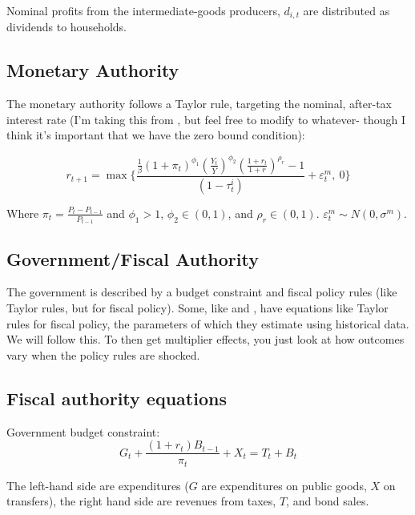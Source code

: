\documentclass[article,11pt,letterpaper,fleqn]{article}
\theoremstyle{definition}
\numberwithin{equation}{section}
\newcommand{\cn}{\citeasnoun} %
\begin{document}
Nominal profits from the intermediate-goods producers, $d_{i,t}$ are distributed as dividends to households.  



\subsection{Monetary Authority}

The monetary authority follows a Taylor rule, targeting the nominal, after-tax interest rate (I'm taking this from \cn{CER2010}, but feel free to modify to whatever- though I think it's important that we have the zero bound condition):

\begin{equation}
\label{Taylor_Rule}
r_{t+1} = \max\Biggl\{\frac{\frac{1}{\beta}(1+\pi_{t})^{\phi_{1}}\left(\frac{Y_{t}}{\bar{Y}}\right)^{\phi_{2}}\left(\frac{1+r_{t}}{1+\bar{r}}\right)^{\rho_{r}} - 1}{(1-\tau^{i}_{t})}+\varepsilon^{m}_{t},\: 0\Biggr\}
\end{equation}

Where $\pi_{t}=\frac{P_{t}-P_{t-1}}{P_{t-1}}$ and $\phi_{1} > 1$,  $\phi_{2}\in(0,1)$, and  $\rho_{r}\in(0,1)$.  $\varepsilon^{m}_{t}\sim N(0,\sigma^{m})$.

\subsection{Government/Fiscal Authority}

The government is described by a budget constraint and fiscal policy rules (like Taylor rules, but for fiscal policy).  Some, like \cn{Zubairy2010} and \cn{TY2010}, have equations like Taylor rules for fiscal policy, the parameters of which they estimate using historical data.  We will follow this.  To then get multiplier effects, you just look at how outcomes vary when the policy rules are shocked.

\subsection{Fiscal authority equations}\label{TAppSecFiscAuth}

Government budget constraint:
\begin{equation}\label{TAppEqGovtBC}
    G_{t} +  \frac{(1+r_{t})B_{t-1}}{\pi_{t}} + X_{t} = T_{t} + B_{t} 
\end{equation}

The left-hand side are expenditures ($G$ are expenditures on public goods, $X$ on transfers), the right hand side  are revenues from taxes, $T$, and bond sales.
\end{document}
